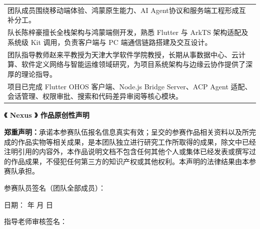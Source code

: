 \documentclass[12pt,a4paper,openany]{ctexbook}
\newcommand{\sanhao}{\fontsize{16pt}{24pt}\selectfont}
\newcommand{\正文}{\wuhao}
\begin{document}
\begin{tabular}{|>{\raggedright\arraybackslash}p{14.0cm}|}
\hline
团队成员围绕移动端体验、鸿蒙原生能力、AI Agent协议和服务端工程形成互补分工。\\[4pt]
队长陈梓豪擅长全栈架构与鸿蒙端侧开发，熟悉 Flutter 与 ArkTS 架构适配及系统级 Kit 调用，负责客户端与 PC 端通信链路搭建及交互设计。\\[4pt]
团队指导教师赵来平教授为天津大学软件学院教授，长期从事数据中心、云计算、软件定义网络与智能运维领域研究，为项目系统架构与边缘云协作提供了深厚的理论指导。\\[4pt]
项目已完成 Flutter OHOS 客户端、Node.js Bridge Server、ACP Agent 适配、会话管理、权限审批、搜索和代码差异审阅等核心模块。\\
\hline
\end{tabular}

\newpage

\begin{center}
{\sanhao\bfseries 《 Nexus 》 作品原创性声明}
\end{center}

\vspace{1.2cm}

\begingroup
{}
\noindent \textbf{郑重声明：}承诺本参赛队伍报名信息真实有效；呈交的参赛作品相关资料以及所完成的作品实物等相关成果，是本团队独立进行研究工作所取得的成果，除文中已经注明引用的内容外，本作品说明文档不包含任何其他个人或集体已经发表或撰写过的作品成果，不侵犯任何第三方的知识产权或其他权利。本声明的法律结果由本参赛队承担。

\vspace{2.5cm}

\noindent 参赛队员签名（团队全部成员）：\uline{\hspace{6cm}}

\vspace{1.2cm}

\noindent\hspace*{12.5cm} 日期：\hspace{0.8cm} 年 \hspace{0.6cm} 月 \hspace{0.6cm} 日

\vspace{2.5cm}

\noindent 指导老师审核签名：\uline{\hspace{6cm}}
\end{document}
